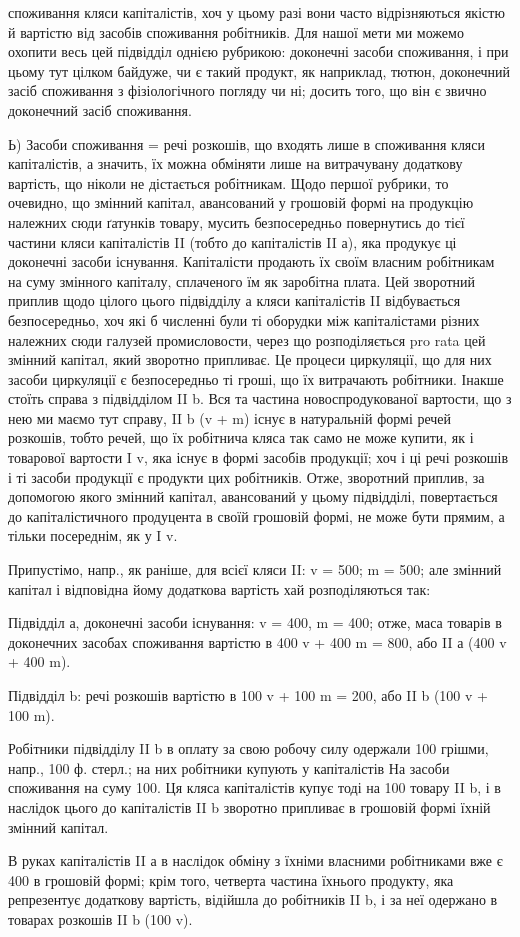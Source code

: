 \parcont{}  %
споживання кляси капіталістів, хоч у цьому разі вони часто відрізняються
якістю й вартістю від засобів споживання робітників. Для нашої мети
ми можемо охопити весь цей підвідділ однією рубрикою: доконечні
засоби споживання, і при цьому тут цілком байдуже, чи є такий продукт,
як наприклад, тютюн, доконечний засіб споживання з фізіологічного
погляду чи ні; досить того, що він є звично доконечний засіб споживання.

Ь) Засоби споживання = речі розкошів, що входять лише в
споживання кляси капіталістів, а значить, їх можна обміняти лише на
витрачувану додаткову вартість, що ніколи не дістається робітникам.
Щодо першої рубрики, то очевидно, що змінний капітал, авансований у
грошовій формі на продукцію належних сюди ґатунків товару, мусить
безпосередньо повернутись до тієї частини кляси капіталістів II (тобто
до капіталістів II а), яка продукує ці доконечні засоби існування. Капіталісти
продають їх своїм власним робітникам на суму змінного капіталу,
сплаченого їм як заробітна плата. Цей зворотний приплив щодо цілого
цього підвідділу а кляси капіталістів II відбувається безпосередньо,
хоч які б численні були ті оборудки між капіталістами різних належних
сюди галузей промисловости, через що розподіляється pro rata
цей змінний капітал, який зворотно припливає. Це процеси циркуляції,
що для них засоби циркуляції є безпосередньо ті гроші, що їх витрачають
робітники. Інакше стоїть справа з підвідділом II b. Вся та частина
новоспродукованої вартости, що з нею ми маємо тут справу, II b (v + m)
існує в натуральній формі речей розкошів, тобто речей, що їх робітнича
кляса так само не може купити, як і товарової вартости I v, яка існує
в формі засобів продукції; хоч і ці речі розкошів і ті засоби продукції
є продукти цих робітників. Отже, зворотний приплив, за допомогою
якого змінний капітал, авансований у цьому підвідділі, повертається до
капіталістичного продуцента в своїй грошовій формі, не може бути
прямим, а тільки посереднім, як у I v.

Припустімо, напр., як раніше, для всієї кляси II: v = 500; m = 500;
але змінний капітал і відповідна йому додаткова вартість хай розподіляються
так:

Підвідділ а, доконечні засоби існування: v = 400, m = 400; отже,
маса товарів в доконечних засобах споживання вартістю в 400 v + 400 m
= 800, або II а (400 v + 400 m).

Підвідділ b: речі розкошів вартістю в 100 v + 100 m = 200, або
II b (100 v + 100 m).

Робітники підвідділу II b в оплату за свою робочу силу одержали
100 грішми, напр., 100 ф. стерл.; на них робітники купують у капіталістів
На засоби споживання на суму 100. Ця кляса капіталістів купує
тоді на 100 товару II b, і в наслідок цього до капіталістів II b зворотно
припливає в грошовій формі їхній змінний капітал.

В руках капіталістів II а в наслідок обміну з їхніми власними робітниками
вже є 400 в грошовій формі; крім того, четверта частина їхнього
продукту, яка репрезентує додаткову вартість, відійшла до робітників
II b, і за неї одержано в товарах розкошів II b (100 v).

